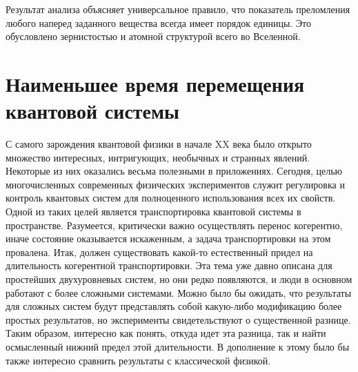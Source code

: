 \documentclass[a4paper, 14pt]{extarticle}
\begin{document}
Результат анализа объясняет универсальное правило, что показатель 
преломления любого наперед заданного вещества всегда имеет порядок 
единицы. Это обусловлено зернистостью и атомной структурой всего во 
Вселенной.



\clearpage \section{Наименьшее время перемещения квантовой системы}

С самого зарождения квантовой физики в начале XX века было открыто 
множество интересных, интригующих, необычных и странных явлений. 
Некоторые из них оказались весьма полезными в приложениях. Сегодня, 
целью многочисленных современных физических экспериментов служит 
регулировка и контроль квантовых систем для полноценного использования 
всех их свойств. Одной из таких целей является транспортировка квантовой 
системы в пространстве. Разумеется, критически важно осуществлять 
перенос когерентно, иначе состояние оказывается искаженным, а задача 
транспортировки на этом провалена. Итак, должен существовать какой-то 
естественный придел на длительность когерентной транспортировки. Эта 
тема уже давно описана для простейших двухуровневых систем, но они редко 
появляются, и люди в основном работают с более сложными системами. Можно 
было бы ожидать, что результаты для сложных систем будут представлять 
собой какую-либо модификацию более простых результатов, но эксперименты 
свидетельствуют о существенной разнице. Таким образом, интересно как 
понять, откуда идет эта разница, так и найти осмысленный нижний предел 
этой длительности. В дополнение к этому было бы также интересно сравнить 
результаты с классической физикой.


\end{document}
